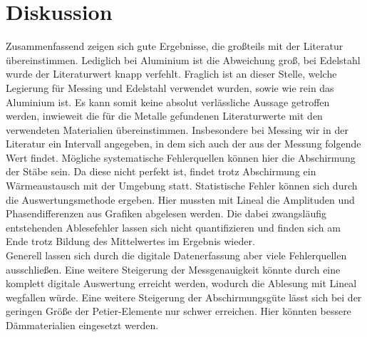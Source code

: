 \section{Diskussion}
Zusammenfassend zeigen sich gute Ergebnisse, die großteils mit der Literatur übereinstimmen. Lediglich bei Aluminium ist die Abweichung groß, bei Edelstahl wurde der Literaturwert
knapp verfehlt. Fraglich ist an dieser Stelle, welche Legierung für Messing und Edelstahl verwendet wurden, sowie wie rein das Aluminium ist. Es kann somit
keine absolut verlässliche Aussage getroffen werden, inwieweit die für die Metalle gefundenen Literaturwerte mit den verwendeten Materialien übereinstimmen. Insbesondere bei Messing
wir in der Literatur ein Intervall angegeben, in dem sich auch der aus der Messung folgende Wert findet.
Mögliche systematische Fehlerquellen können hier die Abschirmung der Stäbe sein. Da diese nicht perfekt ist, findet trotz
Abschirmung ein Wärmeaustausch mit der Umgebung statt. Statistische Fehler können sich durch die Auswertungsmethode ergeben. Hier mussten
mit Lineal die Amplituden und Phasendifferenzen aus Grafiken abgelesen werden. Die dabei zwangsläufig entstehenden Ablesefehler lassen sich
nicht quantifizieren und finden sich am Ende trotz Bildung des Mittelwertes im Ergebnis wieder.
\\
Generell lassen sich durch die digitale Datenerfassung aber viele Fehlerquellen ausschließen. Eine weitere Steigerung der Messgenauigkeit könnte
durch eine komplett digitale Auswertung erreicht werden, wodurch die Ablesung mit Lineal wegfallen würde. Eine weitere Steigerung der Abschirmungsgüte
lässt sich bei der geringen Größe der Petier-Elemente nur schwer erreichen. Hier könnten bessere Dämmaterialien eingesetzt werden.

\newpage
\nocite{*}
\printbibliography
